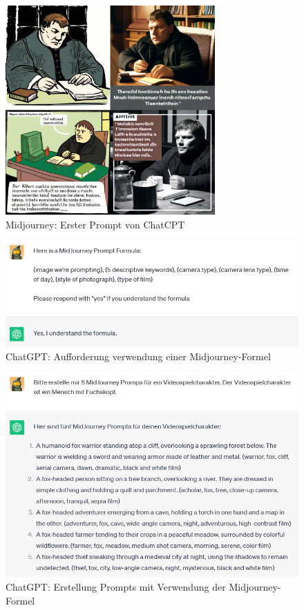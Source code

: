 \begin{figure}
    \centering
    \includegraphics[width=8.022cm]{BilderFuerBA/MLaufEnglisch.png}
    \caption{Midjourney: Erster Prompt von ChatCPT}
    \label{Midjourney_erster_Prompt}
\end{figure}

\begin{figure}
    \centering
    \includegraphics[width=14cm]{BilderFuerBA/04.png}
    \caption{ChatGPT: Aufforderung verwendung einer Midjourney-Formel}
    \label{chatgpt-ptompt-Midjourney-04}
\end{figure}
\begin{figure}
    \centering
    \includegraphics[width=14cm]{BilderFuerBA/05.png}
    \caption{ChatGPT: Erstellung Prompts mit Verwendung der Midjourney-Formel}
    \label{chatgpt_mj-formel_mit_Klammern}
\end{figure}

